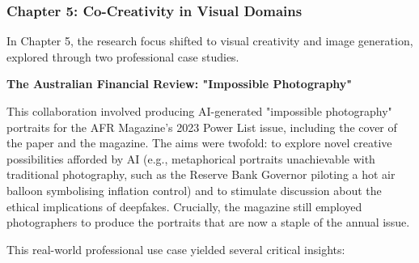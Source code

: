 \subsubsection{\textbf{Chapter 5: Co-Creativity in Visual Domains}}

In Chapter 5, the research focus shifted to visual creativity and image generation, explored through two professional case studies.

\textbf{The Australian Financial Review: "Impossible Photography"}

This collaboration involved producing AI-generated "impossible photography" portraits for the AFR Magazine's 2023 Power List issue, including the cover of the paper and the magazine. The aims were twofold: to explore novel creative possibilities afforded by AI (e.g., metaphorical portraits unachievable with traditional photography, such as the Reserve Bank Governor piloting a hot air balloon symbolising inflation control) and to stimulate discussion about the ethical implications of deepfakes. Crucially, the magazine still employed photographers to produce the portraits that are now a staple of the annual issue. 

This real-world professional use case yielded several critical insights:

